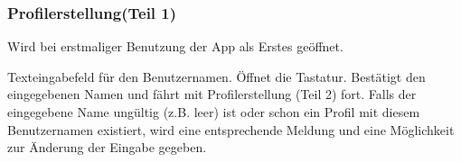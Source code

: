 \begin{center}
\setlength\fboxsep{20pt}
\setlength\fboxrule{1pt}
\end{center}

\subsubsection{Profilerstellung(Teil 1)}
Wird bei erstmaliger Benutzung der App als Erstes geöffnet.
\begin{requirements}
 Texteingabefeld für den Benutzernamen. Öffnet die Tastatur.
 Bestätigt den eingegebenen Namen und fährt mit Profilerstellung (Teil 2) fort. Falls der eingegebene Name ungültig (z.B. leer) ist oder schon ein Profil mit diesem Benutzernamen existiert, wird eine entsprechende Meldung und eine Möglichkeit zur Änderung der Eingabe gegeben.
\end{requirements}

\begin{center}
\setlength\fboxsep{20pt}
\setlength\fboxrule{1pt}
\end{center}

